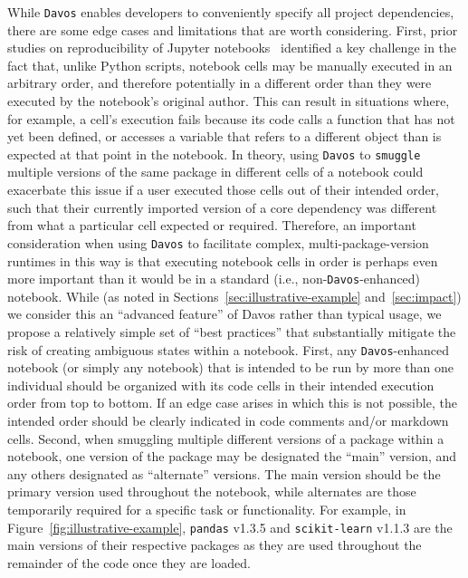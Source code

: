 \documentclass[preprint,12pt,a4paper]{elsarticle}
\begin{document}
While \texttt{Davos} enables developers to conveniently specify all project
dependencies, there are some edge cases and limitations that are worth
considering.
First, prior studies on reproducibility of Jupyter notebooks~\cite[e.g.,][]{PimeEtal19} identified a key challenge in the fact that, unlike Python scripts, notebook cells may be manually executed in an arbitrary order, and therefore potentially in a different order than they were executed by the notebook's original author.
This can result in situations where, for example, a cell's execution fails because its code calls a function that has not yet been defined, or accesses a variable that refers to a different object than is expected at that point in the notebook.
In theory, using \texttt{Davos} to \texttt{smuggle} multiple versions of the same package in different cells of a notebook could exacerbate this issue if a user executed those cells out of their intended order, such that their currently imported version of a core dependency was different from what a particular cell expected or required.
Therefore, an important consideration when using \texttt{Davos} to facilitate complex, multi-package-version runtimes in this way is that executing notebook cells in order is perhaps even more important than it would be in a standard (i.e., non-\texttt{Davos}-enhanced) notebook.
While (as noted in Sections~\ref{sec:illustrative-example} and~\ref{sec:impact}) we consider this an ``advanced feature'' of Davos rather than typical usage, we propose a relatively simple set of ``best practices'' that substantially mitigate the risk of creating ambiguous states within a notebook.
First, any \texttt{Davos}-enhanced notebook (or simply any notebook) that is intended to be run by more than one individual should be organized with its code cells in their intended execution order from top to bottom.
If an edge case arises in which this is not possible, the intended order should be clearly indicated in code comments and/or markdown cells.
Second, when smuggling multiple different versions of a package within a notebook, one version of the package may be designated the ``main'' version, and any others designated as ``alternate'' versions.
The main version should be the primary version used throughout the notebook, while alternates are those temporarily required for a specific task or functionality.
For example, in Figure~\ref{fig:illustrative-example}, \texttt{pandas} v1.3.5 and \texttt{scikit-learn} v1.1.3 are the main versions of their respective packages as they are used throughout the remainder of the code once they are loaded.
\end{document}
